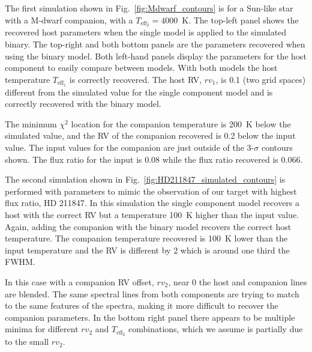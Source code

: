 The first simulation shown in Fig.~\ref{fig:Mdwarf_contours} is for a Sun-like star with a M-dwarf companion, with a \(T_{\textrm{eff}_2} =4000\)~K. The top-left panel shows the recovered host parameters when the single model is applied to the simulated binary. The top-right and both bottom panels are the parameters recovered when using the binary model. Both left-hand panels display the parameters for the host component to easily compare between models. With both models the host temperature \(T_{\textrm{eff}_1}\) is correctly recovered. The host RV, \({rv}_1\), is 0.1\kmps{} (two grid spaces) different from the simulated value for the single component model and is correctly recovered with the binary model.

The minimum \(\chi^2\) location for the companion temperature is 200~K below the simulated value, and the RV of the companion recovered is 0.2\kmps{} below the input value. The input values for the companion are just outside of the 3-\(\sigma\) contours shown. The flux ratio for the input is 0.08 while the flux ratio recovered is 0.066. 

The second simulation shown in Fig.~\ref{fig:HD211847_simulated_contours} is performed with parameters to mimic the observation of our target with highest flux ratio, {HD 211847}. In this simulation the single component model recovers a host with the correct RV but a temperature 100~K higher than the input value. Again, adding the companion with the binary model recovers the correct host temperature. The companion temperature recovered is 100~K lower than the input temperature and the RV is different by 2\kmps{} which is around one third the FWHM.

In this case with a companion RV offset, \({rv}_2\), near 0\kmps{} the host and companion lines are blended. The same spectral lines from both components are trying to match to the same features of the spectra, making it more difficult to recover the companion parameters. In the bottom right panel there appears to be multiple minima for different \({rv}_2\) and \(T_{\textrm{eff}_2}\) combinations, which we assume is partially due to the small \({rv}_2\).

